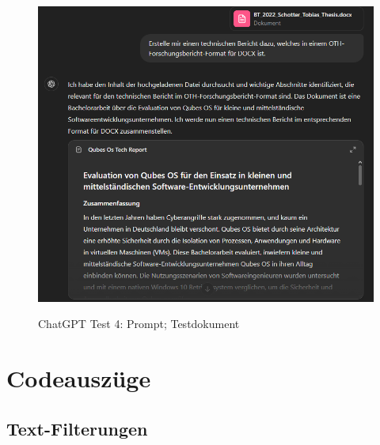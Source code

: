 \begin{figure}[H]
\centering
\includegraphics[width=1\linewidth]{Images/DOCXzuDOCX.png}\\
\caption{Chat\ac{GPT} Test 4: Prompt; Testdokument \cite{schotter_tobias_2022bt}}
\label{fig:docxzudocx}
\end{figure}


\chapter{Codeauszüge}

\section{Text-Filterungen}

